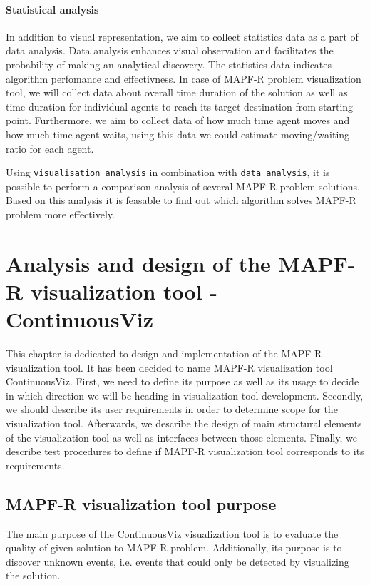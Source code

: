 \documentclass[thesis=B,english]{FITthesis}[2019/12/23]
\begin{document}
\subsubsection{Statistical analysis}

In addition to visual representation, we aim to collect statistics data as a part of data analysis. Data analysis enhances visual observation and facilitates the probability of making an analytical discovery. The statistics data indicates algorithm perfomance and effectivness. In case of MAPF-R problem visualization tool, we will collect data about overall time duration of the solution as well as time duration for individual agents to reach its target destination from starting point. Furthermore, we aim to collect data of how much time agent moves and how much time agent waits, using this data we could estimate moving/waiting ratio for each agent. 

Using \verb|visualisation analysis| in combination with \verb|data analysis|, it is possible to perform a comparison analysis of several MAPF-R problem solutions. Based on this analysis it is feasable to find out which algorithm solves MAPF-R problem more effectively.


\chapter{Analysis and design of the MAPF-R visualization tool - ContinuousViz}

This chapter is dedicated to design and implementation of the MAPF-R visualization tool. It has been decided to name MAPF-R visualization tool ContinuousViz. First, we need to define its purpose as well as its usage to decide in which direction we will be heading in visualization tool development. Secondly, we should describe its user requirements in order to determine scope for the visualization tool. Afterwards, we describe the design of main structural elements of the visualization tool as well as interfaces between those elements. Finally, we describe test procedures to define if MAPF-R visualization tool corresponds to its requirements.

\section{MAPF-R visualization tool purpose}

The main purpose of the ContinuousViz visualization tool is to evaluate the quality of given solution to MAPF-R problem. Additionally, its purpose is to discover unknown events, i.e. events that could only be detected by visualizing the solution.  
\end{document}
